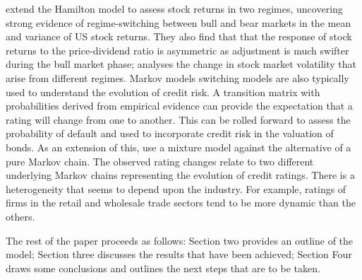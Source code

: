 \documentclass[12pt, a4paper, oneside]{article} %
\begin{document}



\citet{schaller1997regime} extend the Hamilton model to assess stock returns in two regimes, uncovering strong evidence of regime-switching between bull and bear markets in the mean and variance of US stock returns.  They also find that that the response of stock returns to the price-dividend ratio is asymmetric as adjustment is much swifter during the bull market phase; \citet{dueker1997markov} analyses the change in stock market volatility that arise from different regimes. Markov models switching models are also typically used to understand the evolution of credit risk.  A transition matrix with probabilities derived from empirical evidence can provide the expectation that a rating will change from one to another.  This can be rolled forward to assess the probability of default and used to incorporate credit risk in the valuation of bonds.  As an extension of this,  \citet{frydman2008credit} use a mixture model against the alternative of a pure Markov chain. The observed rating changes relate to two different underlying Markov chains representing the evolution of credit ratings.  There is a heterogeneity that seems to depend upon the industry.  For example, ratings of firms in the retail and wholesale trade sectors tend to be more dynamic than the others. 

The rest of the paper proceeds as follows:  Section two provides an outline of the model; Section three discusses the results that have been achieved; Section Four draws some conclusions and outlines the next steps that are to be taken. 
\end{document}

